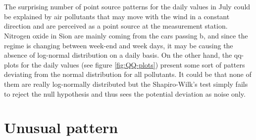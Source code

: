 \documentclass[a4paper, 12pt]{article}
\begin{document}
    \\
    \\
    The surprising number of point source patterns for the daily values in July could be explained by air pollutants that may move with the wind in a constant direction and are perceived as a point source at the measurement station. Nitrogen oxide in Sion are mainly coming from the cars passing b, and since the regime is changing between week-end and week days, it may be causing the absence of log-normal distribution on a daily basis. On the other hand, the qq-plots for the daily values (see figure \ref{fig:QQ-plots}) present some sort of patters deviating from the normal distribution for all pollutants. It could be that none of them are really log-normally distributed but the Shapiro-Wilk's test simply fails to reject the null hypothesis and thus sees the potential deviation as noise only.
        
\section{Unusual pattern}
\end{document}
